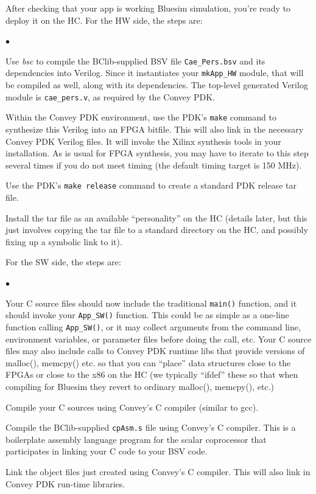 \documentclass[twoside,letterpaper,11pt]{article}
\newenvironment{tightlist}%
{\begin{list}{$\bullet$}{%
    \setlength{\topsep}{0in}
    \setlength{\partopsep}{0in}
    \setlength{\itemsep}{0in}
    \setlength{\parsep}{0in}
    \setlength{\leftmargin}{1.5em}
    \setlength{\rightmargin}{0in}
    \setlength{\itemindent}{0in}
}
}%
{\end{list}
}
\begin{document}
After checking that your app is working Bluesim simulation, you're
ready to deploy it on the HC.  For the HW side, the steps are:
\begin{tightlist}
\item Use \emph{bsc} to compile the BClib-supplied BSV file
  \verb|Cae_Pers.bsv| and its dependencies into Verilog.  Since it
  instantiates your \verb|mkApp_HW| module, that will be compiled as
  well, along with its dependencies.  The top-level generated Verilog
  module is \verb|cae_pers.v|, as required by the Convey PDK.

\item Within the Convey PDK environment, use the PDK's {\tt make} command
  to synthesize this Verilog into an FPGA bitfile.  This will also
  link in the necessary Convey PDK Verilog files.  It will invoke the
  Xilinx synthesis tools in your installation.  As is usual for FPGA
  synthesis, you may have to iterate to this step several times if you
  do not meet timing (the default timing target is 150 MHz).

\item Use the PDK's {\tt make release} command to create a standard PDK
  release tar file.

\item Install the tar file as an available ``personality'' on the HC
  (details later, but this just involves copying the tar file to a
  standard directory on the HC, and possibly fixing up a symbolic link
  to it).
\end{tightlist}

For the SW side, the steps are:
\begin{tightlist}

\item Your C source files should now include the traditional
  \verb|main()| function, and it should invoke your \verb|App_SW()|
  function.  This could be as simple as a one-line function calling
  \verb|App_SW()|, or it may collect arguments from the command line,
  environment variables, or parameter files before doing the call,
  etc.  Your C source files may also include calls to Convey PDK
  runtime libs that provide versions of malloc(), memcpy() etc. so
  that you can ``place'' data structures close to the FPGAs or close
  to the x86 on the HC (we typically ``ifdef'' these so that when
  compiling for Bluesim they revert to ordinary malloc(), memcpy(),
  etc.)

\item Compile your C sources using Convey's C compiler (similar to gcc).

\item Compile the BClib-supplied \verb|cpAsm.s| file using Convey's C
  compiler.  This is a boilerplate assembly language program for the
  scalar coprocessor that participates in linking your C code to your
  BSV code.

\item Link the object files just created using Convey's C compiler.
  This will also link in Convey PDK run-time libraries.
\end{tightlist}
\end{document}
